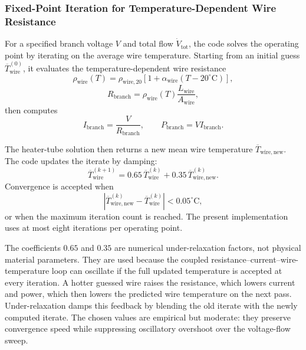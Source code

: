 \documentclass{article}
\begin{document}
\subsubsection{Fixed-Point Iteration for Temperature-Dependent Wire Resistance}

For a specified branch voltage $V$ and total flow $\dot{V}_{\mathrm{tot}}$,
the code solves the operating point by iterating on the average wire
temperature. Starting from an initial guess
$\overline{T}_{\mathrm{wire}}^{(0)}$, it evaluates the temperature-dependent
wire resistance
\begin{equation}
\rho_{\mathrm{wire}}(T)
= \rho_{\mathrm{wire},20}
\left[1 + \alpha_{\mathrm{wire}}(T-20^\circ\mathrm{C})\right],
\end{equation}
\begin{equation}
R_{\mathrm{branch}}
= \rho_{\mathrm{wire}}(T)
\frac{L_{\mathrm{wire}}}{A_{\mathrm{wire}}},
\end{equation}
then computes
\begin{equation}
I_{\mathrm{branch}} = \frac{V}{R_{\mathrm{branch}}},
\qquad
P_{\mathrm{branch}} = V I_{\mathrm{branch}}.
\end{equation}

The heater-tube solution then returns a new mean wire temperature
$\overline{T}_{\mathrm{wire,new}}$. The code updates the iterate by damping:
\begin{equation}
\overline{T}_{\mathrm{wire}}^{(k+1)}
= 0.65\,\overline{T}_{\mathrm{wire}}^{(k)}
+ 0.35\,\overline{T}_{\mathrm{wire,new}}^{(k)}.
\end{equation}
Convergence is accepted when
\begin{equation}
\left|
\overline{T}_{\mathrm{wire,new}}^{(k)} -
\overline{T}_{\mathrm{wire}}^{(k)}
\right| < 0.05^\circ\mathrm{C},
\end{equation}
or when the maximum iteration count is reached. The present implementation
uses at most eight iterations per operating point.

The coefficients $0.65$ and $0.35$ are numerical under-relaxation factors,
not physical material parameters. They are used because the coupled
resistance--current--wire-temperature loop can oscillate if the full updated
temperature is accepted at every iteration. A hotter guessed wire raises the
resistance, which lowers current and power, which then lowers the predicted
wire temperature on the next pass. Under-relaxation damps this feedback by
blending the old iterate with the newly computed iterate. The chosen values
are empirical but moderate: they preserve convergence speed while suppressing
oscillatory overshoot over the voltage-flow sweep.
\end{document}
